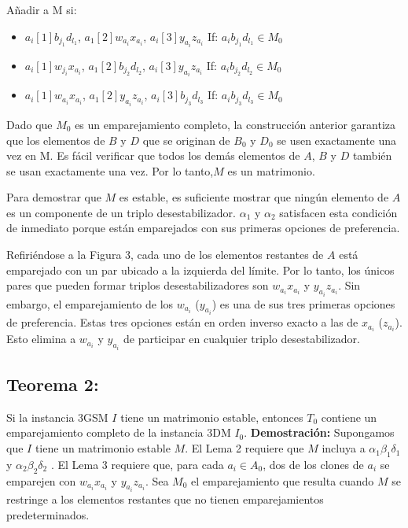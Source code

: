 \documentclass{article}
\begin{document}
Añadir a M si:
\begin{itemize}
    \item $a_i[1]b_{j_1}d_{l_1}$, $a_1[2]w_{a_i}x_{a_i}$, $a_i[3]y_{a_i}z_{a_i}$ If: $a_i b_{j_1} d_{l_1} \in M_0$ 
    \item $a_i[1]w_{j_i}x_{a_i}$, $a_1[2]b_{j_2}d_{l_2}$, $a_i[3]y_{a_i}z_{a_i}$ If: $a_i b_{j_2} d_{l_2} \in M_0$ 
    \item $a_i[1]w_{a_i}x_{a_i}$, $a_1[2]y_{a_i}z_{a_i}$, $a_i[3]b_{j_3}d_{l_3}$ If: $a_i b_{j_3} d_{l_3} \in M_0$ 
\end{itemize}

Dado que $M_0$ es un emparejamiento completo, la construcción anterior garantiza que los elementos de $B$ y $D$ que se originan de $B_0$ y $D_0$ se usen exactamente una vez en M. 
Es fácil verificar que todos los demás elementos de $A$, $B$ y $D$ también se usan exactamente una vez. Por lo tanto,$M$ es un matrimonio.


Para demostrar que $M$ es estable, es suficiente mostrar que ningún elemento de $A$ es un componente de un triplo desestabilizador. $\alpha_1$ y $\alpha_2$ satisfacen esta condición de inmediato porque
están emparejados con sus primeras opciones de preferencia.

Refiriéndose a la Figura 3, cada uno de los elementos restantes de $A$
está emparejado con un par ubicado a la izquierda del límite. Por lo tanto, los únicos pares
que pueden formar triplos desestabilizadores son $w_{a_i} x_{a_i}$ y $y_{a_i}z_{a_i}$. Sin embargo,
el emparejamiento de los $w_{a_i}$ ($y_{a_i}$) es una de sus tres primeras
opciones de preferencia.
Estas tres opciones están en orden inverso
exacto a las de $x_{a_i}$ ($z_{a_i}$). Esto elimina a $w_{a_i}$ y $y_{a_i}$ de participar en cualquier
triplo desestabilizador.

\subsection{Teorema 2:}
Si la instancia 3GSM $I$ tiene un matrimonio estable,
entonces $T_0$ contiene un emparejamiento completo de la instancia 3DM $I_0$.
\textbf{Demostración:}
Supongamos que $I$ tiene un matrimonio estable $M$. El Lema 2 requiere que $M$ incluya a 
$\alpha_1 \beta_1 \delta_1$  y $\alpha_2 \beta_2 \delta_2$ . El Lema 3 requiere que, para cada $a_i \in A_0$,
dos de los clones de $a_i$ se emparejen con $w_{a_i} x_{a_i}$ y $y_{a_i} z_{a_i}$.
Sea $M_0$ el emparejamiento que resulta cuando $M$ se restringe a los elementos
restantes que no tienen emparejamientos predeterminados.
\end{document}
